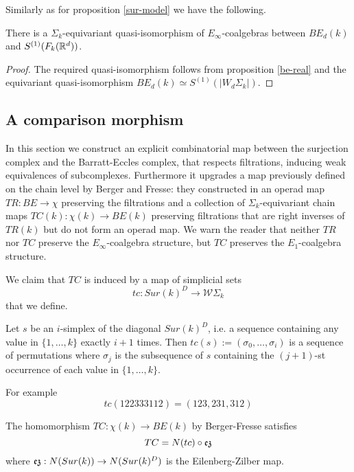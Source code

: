 Similarly as for proposition \ref{sur-model} we have the following.

\begin{proposition}
	There is a  $\Sigma_k$-equivariant quasi-isomorphism
	of $E_\infty$-coalgebras between $BE_d(k)$ and
	$S^{(1)}(F_k(\mathbb{R}^d))$.
\end{proposition}

\begin{proof} \label{be-model}
	The required quasi-isomorphism follows from proposition \ref{be-real} and the equivariant quasi-isomorphism $BE_d(k) \simeq S^{(1)}(|W_d\Sigma_k|)$. %
\end{proof}

\subsection{A comparison morphism}

In this section we construct an explicit combinatorial map between the surjection complex and the Barratt-Eccles complex, that respects filtrations, inducing weak equivalences of subcomplexes.
Furthermore it upgrades a map previously defined on the chain level by Berger and Fresse: they constructed in \cite{BFsmall}
an operad map $TR:BE \to \chi$ preserving the filtrations and a collection of $\Sigma_k$-equivariant
chain maps $TC(k):\chi(k) \to BE(k)$ preserving filtrations
that are right inverses of $TR(k)$ but do not form an operad map.
We warn the reader that neither $TR$ nor $TC$ preserve the $E_\infty$-coalgebra structure, but
$TC$ preserves the $E_1$-coalgebra structure.

We claim that $TC$ is induced by a map of simplicial sets
$$tc: Sur(k)^D \to \mathcal{W}\Sigma_k$$ that we define.
\begin{definition}
	Let $s$ be an $i$-simplex  of the diagonal $Sur(k)^D$, i.e. a sequence containing any value in $\{1,\dots,k\}$ exactly $i+1$ times.
	Then $tc(s):=(\sigma_0,\dots,\sigma_i)$ is a sequence of permutations where $\sigma_j$ is the subsequence of $s$ containing the $(j+1)$-st occurrence of each value in $\{1,\dots,k\}$.
\end{definition}

For example
$$tc(122333112)=(123,231,312)$$

\begin{proposition}
	The homomorphism $TC:\chi(k) \to BE(k)$ by Berger-Fresse satisfies
	$$TC=N(tc) \circ \operatorname{\mathfrak{ez}}$$ where $\operatorname{\mathfrak{ez}}:N(Sur(k)) \to
	N(Sur(k)^D)$ is the Eilenberg-Zilber map.
\end{proposition}

